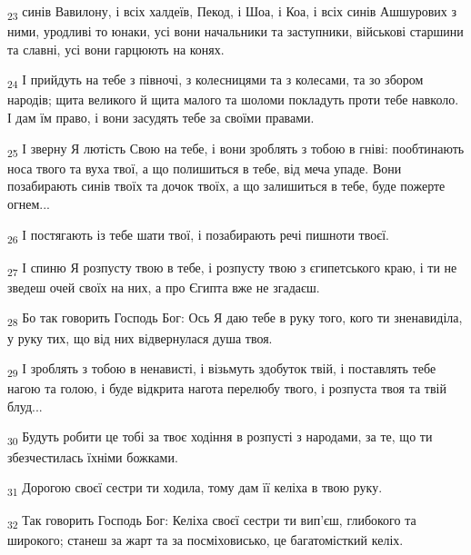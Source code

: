 \begin{tcolorbox}
\textsubscript{23} синів Вавилону, і всіх халдеїв, Пекод, і Шоа, і Коа, і всіх синів Ашшурових з ними, уродливі то юнаки, усі вони начальники та заступники, військові старшини та славні, усі вони гарцюють на конях.
\end{tcolorbox}
\begin{tcolorbox}
\textsubscript{24} І прийдуть на тебе з півночі, з колесницями та з колесами, та зо збором народів; щита великого й щита малого та шоломи покладуть проти тебе навколо. І дам їм право, і вони засудять тебе за своїми правами.
\end{tcolorbox}
\begin{tcolorbox}
\textsubscript{25} І зверну Я лютість Свою на тебе, і вони зроблять з тобою в гніві: пообтинають носа твого та вуха твої, а що полишиться в тебе, від меча упаде. Вони позабирають синів твоїх та дочок твоїх, а що залишиться в тебе, буде пожерте огнем...
\end{tcolorbox}
\begin{tcolorbox}
\textsubscript{26} І постягають із тебе шати твої, і позабирають речі пишноти твоєї.
\end{tcolorbox}
\begin{tcolorbox}
\textsubscript{27} І спиню Я розпусту твою в тебе, і розпусту твою з єгипетського краю, і ти не зведеш очей своїх на них, а про Єгипта вже не згадаєш.
\end{tcolorbox}
\begin{tcolorbox}
\textsubscript{28} Бо так говорить Господь Бог: Ось Я даю тебе в руку того, кого ти зненавиділа, у руку тих, що від них відвернулася душа твоя.
\end{tcolorbox}
\begin{tcolorbox}
\textsubscript{29} І зроблять з тобою в ненависті, і візьмуть здобуток твій, і поставлять тебе нагою та голою, і буде відкрита нагота перелюбу твого, і розпуста твоя та твій блуд...
\end{tcolorbox}
\begin{tcolorbox}
\textsubscript{30} Будуть робити це тобі за твоє ходіння в розпусті з народами, за те, що ти збезчестилась їхніми божками.
\end{tcolorbox}
\begin{tcolorbox}
\textsubscript{31} Дорогою своєї сестри ти ходила, тому дам її келіха в твою руку.
\end{tcolorbox}
\begin{tcolorbox}
\textsubscript{32} Так говорить Господь Бог: Келіха своєї сестри ти вип'єш, глибокого та широкого; станеш за жарт та за посміховисько, це багатомісткий келіх.
\end{tcolorbox}
